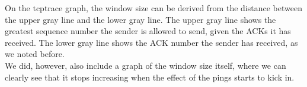 On the tcptrace graph, the window size can be derived from the distance between the upper gray line and the lower gray line. The upper gray line shows the greatest sequence number the sender is allowed to send, given the ACKs it has received. The lower gray line shows the ACK number the sender has received, as we noted before. \\
We did, however, also include a graph of the window size itself, where we can clearly see that it stops increasing when the effect of the pings starts to kick in. 